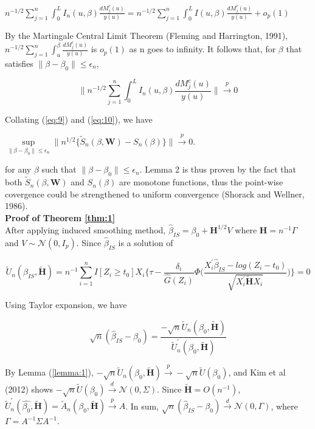 \documentclass[12pt]{article}
\begin{document}
	\begin{center}
	$n^{-1/2}\sum_{j=1}^{n} \int_{0}^{L}I_n(u,\beta)\frac{dM_j^c(u)}{y(u)}=n^{-1/2}\sum_{j=1}^{n}\int_{0}^{L}I(u,\beta)\frac{dM_j^c(u)}{y(u)}+o_p(1)$
	\end{center}
	
	\noindent By the Martingale Central Limit Theorem (Fleming and Harrington, 1991), $n^{-1/2}\sum_{j=1}^{n}\int_{u}^{\beta}\frac{dM_j^c(u)}{y(u)}$ is $o_p(1)$ as n goes to infinity. It follows that, for $\beta$ that satisfies $\lVert \beta - \beta_0 \rVert \leq \epsilon_n$,
	
	\begin{equation} \label{eq:10}
	\Bigg\lVert n^{-1/2} \sum_{j=1}^{n} \int_{0}^{L} I_n(u,\beta)\frac{dM_j^c(u)}{y(u)} \Bigg\rVert \xrightarrow{p} 0
	\end{equation}
	
	\noindent Collating (\ref{eq:9}) and (\ref{eq:10}), we have
	\begin{center}
	$\sup\limits_{\lVert \beta - \beta_0 \rVert \leq \epsilon_n} \lVert {n^{1/2}} \{ \tilde{S}_n(\beta, \textbf{W})-S_n(\beta) \} \rVert \xrightarrow{p} 0$.
	\end{center}
	
	\noindent for any $\beta$ such that $\lVert \beta - \beta_0 \rVert \leq \epsilon_n$. Lemma 2 is thus proven by the fact that both $\tilde{S}_n(\beta, \textbf{W})$ and $S_n(\beta)$ are monotone functions, thus the point-wise covergence could be strengthened to uniform convergence (Shorack and Wellner, 1986).\\
	
	\noindent \textbf{Proof of Theorem \ref{thm:1}}\\
	After applying induced smoothing method, $\hat{\beta}_{IS} = \beta_0+\textbf{H}^{1/2}V$ where $\textbf{H}=n^{-1}\Gamma$ and $V \sim\mathcal{N}(0,I_p)$.
	Since $\hat{\beta}_{IS}$ is a solution of
	
	\begin{equation} \label{eq:11}
	\tilde{U}_n(\hat{\beta}_{IS}, \tilde{\textbf{H}})= n^{-1} \sum_{i=1}^{n} I[Z_i \geq t_0] X_i \Bigg\{\tau -  \frac{\delta_i}{\hat{G}(Z_i)}\Phi\Bigg(\frac{X_i^\prime\hat{\beta}_{IS}-log(Z_i-t_0)}{\sqrt{X_i^{\prime} \tilde{\textbf{H}}X_{i}}}\Bigg) \Bigg\}=0
	\end{equation}
	
	\noindent Using Taylor expansion, we have
	
	\begin{equation} \label{eq:12}
	\sqrt{n}(\hat{\beta}_{IS}-\beta_0) = \frac{-\sqrt{n}\tilde{U}_n(\beta_0, \tilde{\textbf{H}})}{\tilde{U}_n^{\prime}(\beta_0,\tilde{\textbf{H}})}
	\end{equation}
	
	\noindent By Lemma (\ref{lemma:1}), $-\sqrt{n}\tilde{U}_n(\beta_0, \tilde{\textbf{H}}) \xrightarrow{p} -\sqrt{n}\tilde{U}(\beta_0)$, and Kim et al (2012) shows $-\sqrt{n}\tilde{U}(\beta_0) \xrightarrow{d} \mathcal{N}(0,\Sigma)$. Since $\tilde{\textbf{H}}=O(n^{-1})$, $\tilde{U}_n^{\prime}(\hat{\beta_0},\tilde{\textbf{H}})=\tilde{A}_n(\beta_0, \tilde{\textbf{H}}) \xrightarrow{p} A$. In sum,
	$\sqrt{n}(\hat{\beta}_{IS}-\beta_0) \xrightarrow{d} \mathcal{N}(0,\Gamma)$, where $\Gamma = A^{-1}\Sigma A^{-1}$.
	
\end{document}

